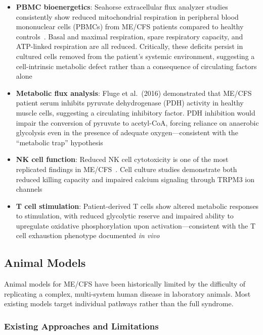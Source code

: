 \begin{itemize}
    \item \textbf{PBMC bioenergetics}: Seahorse extracellular flux analyzer studies consistently show reduced mitochondrial respiration in peripheral blood mononuclear cells (PBMCs) from ME/CFS patients compared to healthy controls~\cite{Mandarano2020, Tomas2017}. Basal and maximal respiration, spare respiratory capacity, and ATP-linked respiration are all reduced. Critically, these deficits persist in cultured cells removed from the patient's systemic environment, suggesting a cell-intrinsic metabolic defect rather than a consequence of circulating factors alone
    \item \textbf{Metabolic flux analysis}: Fluge et al.\ (2016) demonstrated that ME/CFS patient serum inhibits pyruvate dehydrogenase (PDH) activity in healthy muscle cells, suggesting a circulating inhibitory factor. PDH inhibition would impair the conversion of pyruvate to acetyl-CoA, forcing reliance on anaerobic glycolysis even in the presence of adequate oxygen---consistent with the ``metabolic trap'' hypothesis
    \item \textbf{NK cell function}: Reduced NK cell cytotoxicity is one of the most replicated findings in ME/CFS~\cite{Hardcastle2016}. Cell culture studies demonstrate both reduced killing capacity and impaired calcium signaling through TRPM3 ion channels~\cite{Cabanas2021}
    \item \textbf{T cell stimulation}: Patient-derived T cells show altered metabolic responses to stimulation, with reduced glycolytic reserve and impaired ability to upregulate oxidative phosphorylation upon activation---consistent with the T cell exhaustion phenotype documented \textit{in vivo}
\end{itemize}

\subsection{Animal Models}
\label{sec:animal-models}

Animal models for ME/CFS have been historically limited by the difficulty of replicating a complex, multi-system human disease in laboratory animals. Most existing models target individual pathways rather than the full syndrome.

\subsubsection{Existing Approaches and Limitations}

